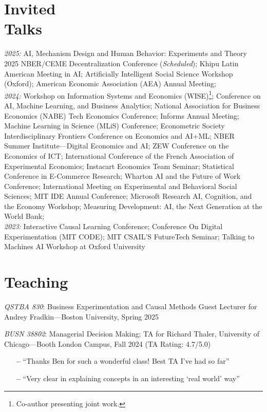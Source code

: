 \documentclass[margin,line,pifont,palatino,courier, 9pt]{res}
\begin{document}
\begin{resume}
\section{\sc Invited\\Talks}
\textit{2025:} 
AI, Mechanism Design and Human Behavior: Experiments and Theory 2025 NBER/CEME Decentralization Conference (\textit{Scheduled});
Khipu Latin American Meeting in AI;
Artificially Intelligent Social Science Workshop (Oxford);
American Economic Association (AEA) Annual Meeting;\vspace{2mm}\\
\textit{2024:} Workshop on Information Systems and Economics (WISE)\footnote{Co-author presenting joint work.};
Conference on AI, Machine Learning, and Business Analytics;
National Association for Business Economics (NABE) Tech Economics Conference; 
Informs Annual Meeting\footnotemark[\value{footnote}];
Machine Learning in Science (MLiS) Conference;
Econometric Society Interdisciplinary Frontiers Conference on Economics and AI+ML; 
NBER Summer Institute---Digital Economics and AI\footnotemark[\value{footnote}];
ZEW Conference on the Economics of ICT;
International Conference of the French Association of Experimental Economics;
Instacart Economics Team Seminar;
Statistical Conference in E-Commerce Research;
Wharton AI and the Future of Work Conference; 
International Meeting on Experimental and Behavioral Social Sciences;
MIT IDE Annual Conference; 
Microsoft Research AI, Cognition, and the Economy Workshop; 
Measuring Development: AI, the Next Generation at the World Bank; 
\vspace{2mm}\\
\textit{2023:} Interactive Causal Learning Conference; 
Conference On Digital Experimentation (MIT CODE); 
MIT CSAIL'S FutureTech Seminar;
Talking to Machines AI Workshop at Oxford University

\section{\sc Teaching}
\textit{QSTBA 830}: Business Experimentation and Causal Methods Guest Lecturer for Andrey Fradkin---Boston University, Spring 2025

\textit{BUSN 38802}: Managerial Decision Making; TA for Richard Thaler, University of Chicago---Booth London Campus, Fall 2024 (TA Rating: 4.7/5.0)
\begin{itemize}
    \item[\textbf{--}] ``Thanks Ben for such a wonderful class! Best TA I've had so far''
    \item[\textbf{--}] ``Very clear in explaining concepts in an interesting `real world' way''
\end{itemize}


\end{resume}
\end{document}
